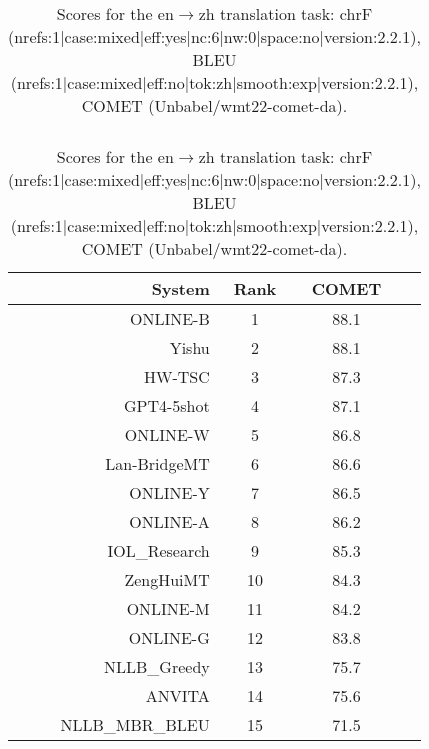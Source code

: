 \documentclass[11pt]{article}
\begin{document}
\begin{table}
\begin{subtable}[t]{0.33\textwidth}
\begin{tabular}{rccc}
\bottomrule 
\end{tabular} 
\end{subtable} 
\begin{subtable}[t]{0.33\textwidth}
\begin{tabular}{rccc}
\toprule 
System & Rank & COMET \\ 
\midrule 
ONLINE-B & 1 & 88.1 \\ 
Yishu & 2 & 88.1 \\ 
HW-TSC & 3 & 87.3 \\ 
GPT4-5shot & 4 & 87.1 \\ 
ONLINE-W & 5 & 86.8 \\ 
Lan-BridgeMT & 6 & 86.6 \\ 
ONLINE-Y & 7 & 86.5 \\ 
ONLINE-A & 8 & 86.2 \\ 
IOL\_Research & 9 & 85.3 \\ 
ZengHuiMT & 10 & 84.3 \\ 
ONLINE-M & 11 & 84.2 \\ 
ONLINE-G & 12 & 83.8 \\ 
NLLB\_Greedy & 13 & 75.7 \\ 
ANVITA & 14 & 75.6 \\ 
NLLB\_MBR\_BLEU & 15 & 71.5 \\ 
\bottomrule 
\end{tabular} 
\end{subtable} 
\caption{Scores for the en$\rightarrow$zh translation task: chrF (nrefs:1|case:mixed|eff:yes|nc:6|nw:0|space:no|version:2.2.1), BLEU (nrefs:1|case:mixed|eff:no|tok:zh|smooth:exp|version:2.2.1), COMET (Unbabel/wmt22-comet-da).} 
\end{table}
\end{document}
